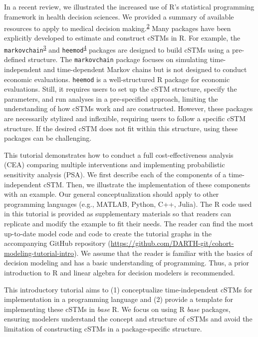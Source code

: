 \documentclass[
]{article}
\begin{document}
In a recent review, we illustrated the increased use of R's statistical programming framework in health decision sciences. We provided a summary of available resources to apply to medical decision making.\textsuperscript{\protect\hyperlink{ref-Jalal2017b}{2}} Many packages have been explicitly developed to estimate and construct cSTMs in R. For example, the \texttt{markovchain}\textsuperscript{\protect\hyperlink{ref-Spedicato2017}{3}} and \texttt{heemod}\textsuperscript{\protect\hyperlink{ref-Filipovic-Pierucci2017}{4}} packages are designed to build cSTMs using a pre-defined structure. The \texttt{markovchain} package focuses on simulating time-independent and time-dependent Markov chains but is not designed to conduct economic evaluations. \texttt{heemod} is a well-structured R package for economic evaluations. Still, it requires users to set up the cSTM structure, specify the parameters, and run analyses in a pre-specified approach, limiting the understanding of how cSTMs work and are constructed. However, these packages are necessarily stylized and inflexible, requiring users to follow a specific cSTM structure. If the desired cSTM does not fit within this structure, using these packages can be challenging.

This tutorial demonstrates how to conduct a full cost-effectiveness analysis (CEA) comparing multiple interventions and implementing probabilistic sensitivity analysis (PSA). We first describe each of the components of a time-independent cSTM. Then, we illustrate the implementation of these components with an example. Our general conceptualization should apply to other programming languages (e.g., MATLAB, Python, C++, Julia). The R code used in this tutorial is provided as supplementary materials so that readers can replicate and modify the example to fit their needs. The reader can find the most up-to-date model code and code to create the tutorial graphs in the accompanying GitHub repository (\url{https://github.com/DARTH-git/cohort-modeling-tutorial-intro}). We assume that the reader is familiar with the basics of decision modeling and has a basic understanding of programming. Thus, a prior introduction to R and linear algebra for decision modelers is recommended.

This introductory tutorial aims to (1) conceptualize time-independent cSTMs for implementation in a programming language and (2) provide a template for implementing these cSTMs in \emph{base} R. We focus on using R \emph{base} packages, ensuring modelers understand the concept and structure of cSTMs and avoid the limitation of constructing cSTMs in a package-specific structure.
\end{document}
